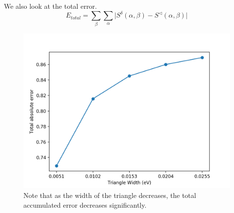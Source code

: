 \documentclass[Master.tex]{subfiles}
\begin{document}
              
              We also look at the total error.
              \[E_{total}=\sum_{\beta}\sum_\alpha \Big|S^\delta(\alpha,\beta)-S^\triangleleft(\alpha,\beta)\Big|\]

            \begin{figure}[h]
              \begin{center}
              \includegraphics[scale=0.6]{diff_widths_total_error}
                \caption{Note that as the width of the triangle decreases, the total accumulated error decreases significantly.}
              \label{fig:diff_widths_total_error}
              \end{center}
            \end{figure}
\end{document}
